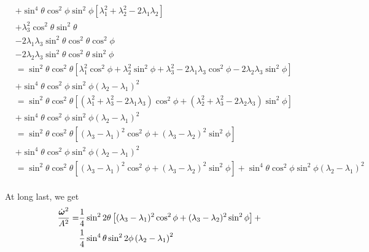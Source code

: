\documentclass[extra,mreferee]{gji}
\begin{document}
\begin{equation}
\begin{aligned}
&+ \sin^4{\theta} \cos^2{\phi}\sin^2{\phi} \left[ \lambda_1^2 + \lambda_2^2 -2 \lambda_1\lambda_2 \right] \\
&+ \lambda_3^2 \cos^2{\theta}\sin^2{\theta} \\
&- 2 \lambda_1 \lambda_3 \sin^2{\theta} \cos^2{\theta} \cos^2{\phi} \\
&- 2 \lambda_2 \lambda_3 \sin^2{\theta} \cos^2{\theta} \sin^2{\phi} \\ 
&=
\sin^2{\theta}\cos^2{\theta} \left[\lambda_1^2 \cos^2{\phi} + \lambda_2^2 \sin^2{\phi} + \lambda_3^2 - 2 \lambda_1 \lambda_3 \cos^2{\phi} - 2 \lambda_2 \lambda_3 \sin^2{\phi} \right] \\
&+ \sin^4{\theta} \cos^2{\phi}\sin^2{\phi} \left( \lambda_2 - \lambda_1 \right)^2 \\
&=
\sin^2{\theta}\cos^2{\theta} \left[( \lambda_1^2 + \lambda_3^2 - 2 \lambda_1 \lambda_3) \cos^2{\phi} + (\lambda_2^2 + \lambda_3^2 - 2 \lambda_2 \lambda_3 ) \sin^2{\phi} \right] \\
&+ \sin^4{\theta} \cos^2{\phi}\sin^2{\phi} \left( \lambda_2 - \lambda_1 \right)^2 \\
&=
\sin^2{\theta}\cos^2{\theta} \left[( \lambda_3 - \lambda_1)^2 \cos^2{\phi} + (\lambda_3 - \lambda_2)^2 \sin^2{\phi} \right] \\
&+ \sin^4{\theta} \cos^2{\phi}\sin^2{\phi} \left( \lambda_2 - \lambda_1 \right)^2 \\
&=
\sin^2{\theta}\cos^2{\theta} \left[( \lambda_3 - \lambda_1)^2 \cos^2{\phi} + (\lambda_3 - \lambda_2)^2 \sin^2{\phi} \right]
+ \sin^4{\theta} \cos^2{\phi}\sin^2{\phi} \left( \lambda_2 - \lambda_1 \right)^2 \\
\end{aligned}
\end{equation}

At long last, we get
\begin{equation}
\begin{aligned}
\frac{\dot{\mitbf{\omega}}^2}{A^2}  = 
&\frac{1}{4}\sin^2{2\theta} \left[( \lambda_3 - \lambda_1)^2 \cos^2{\phi} + (\lambda_3 - \lambda_2)^2 \sin^2{\phi} \right] +\\
&\frac{1}{4}\sin^4{\theta} \sin^2{2\phi}\left( \lambda_2 - \lambda_1 \right)^2 \\
\end{aligned}
\end{equation}

\else
\fi
\end{document}
